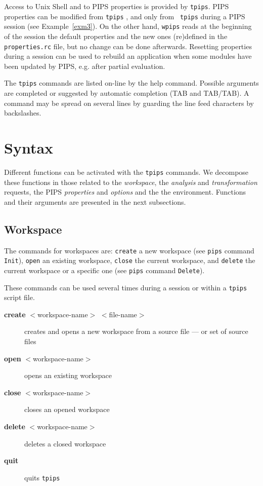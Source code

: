 \documentclass[a4paper,12pt]{article}
\begin{document}
Access to Unix Shell and to PIPS properties is provided by {\tt tpips}.
PIPS properties can be modified from {\tt tpips} , and only from {\tt
  tpips} during a PIPS session (see Example~\ref{exm3}). On the other hand,
{\tt wpips} reads at the
beginning of the session the default properties and the new ones
(re)defined in the {\tt properties.rc} file, but no change can be done
afterwards.  Resetting properties during a session can be used to rebuild
an application when some modules have been updated by PIPS, e.g. after
partial evaluation.

The {\tt tpips} commands are listed on-line by the help command.
Possible arguments are completed or suggested by automatic
completion (TAB and TAB/TAB). A command may be spread on
several lines by guarding the line feed characters by
backslashes.


\section{Syntax}

Different functions can be activated with the \texttt{tpips} commands. We
decompose these functions in those related to the \emph{workspace}, the
\emph{analysis} and \emph{transformation} requests, the PIPS
\emph{properties} and \emph{options} and the the environment.  Functions
and their arguments are presented in the next subsections.


\subsection{Workspace}

The commands for workspaces are: {\tt create} a new workspace (see
\texttt{pips} command \texttt{Init}), {\tt open} an existing workspace,
{\tt close} the current workspace, and {\tt delete} the current workspace
or a specific one (see \texttt{pips} command \texttt{Delete}).

These commands can be used several times during a session or
within a {\tt tpips} script file.

\begin{description}

\item[{\bf create} $<$workspace-name$>$ $<$file-name$>$] creates and
  opens a new workspace from a source file --- or set of source files

\item[{\bf open} $<$workspace-name$>$] opens an existing workspace

\item[{\bf close} $<$workspace-name$>$] closes an opened workspace

\item[{\bf delete} $<$workspace-name$>$] deletes a closed workspace

\item[{\bf quit}] quits {\tt tpips}

\end{description}
\end{document}
